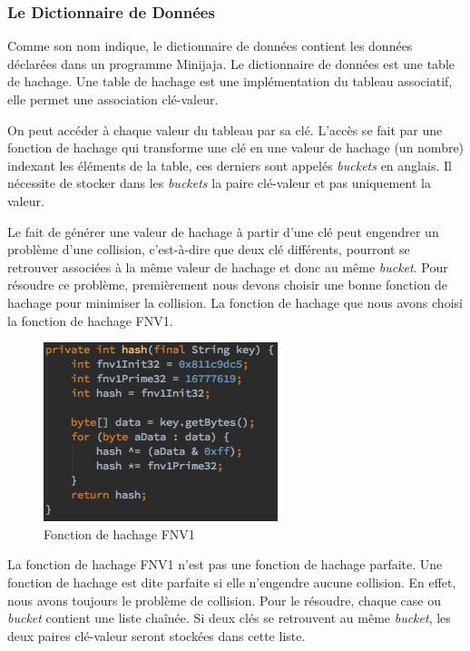 \documentclass[a4paper,12pt]{report}
\begin{document}
\subsubsection{Le Dictionnaire de Données}
Comme son nom indique, le dictionnaire de données contient les données déclarées dans un programme Minijaja. Le dictionnaire de données est une table de hachage. Une table de hachage est une implémentation du tableau associatif, elle permet une association clé-valeur. 

On peut accéder à chaque valeur du tableau par sa clé. L'accès se fait par une fonction de hachage qui transforme une clé en une valeur de hachage (un nombre) indexant les éléments de la table, ces derniers sont appelés \textit{buckets} en anglais. Il nécessite de stocker dans les \textit{buckets} la paire clé-valeur et pas uniquement la valeur.

Le fait de générer une valeur de hachage à partir d'une clé peut engendrer un problème d'une collision, c'est-à-dire que deux clé différents, pourront se retrouver associées à la même valeur de hachage et donc au même \textit{bucket}. Pour résoudre ce problème, premièrement nous devons choisir une bonne fonction de hachage pour minimiser la collision. La fonction de hachage que nous avons choisi la fonction de hachage FNV1.

\begin{figure}[H]
\begin{center}
	\includegraphics[scale=0.5]{hashfunction}
	\caption{Fonction de hachage FNV1}
\end{center}
\end{figure}

La fonction de hachage FNV1 n'est pas une fonction de hachage parfaite. Une fonction de hachage est dite parfaite si elle n'engendre aucune collision. En effet, nous avons toujours le problème de collision. Pour le résoudre, chaque case ou \textit{bucket} contient une liste chaînée. Si deux clés se retrouvent au même \textit{bucket}, les deux paires clé-valeur seront stockées dans cette liste.
\end{document}
